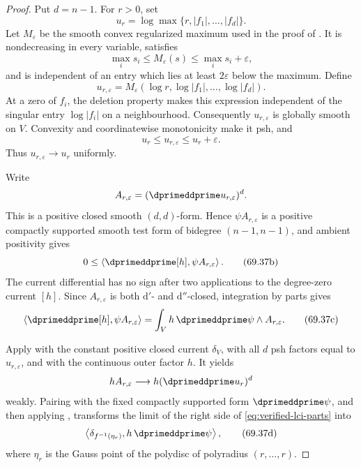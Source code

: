 \begin{proof}
Put \(d=n-1\).  For \(r>0\), set
\[
               u_r=\log\max\{r,|f_1|,\ldots,|f_d|\}.
\]
Let \(M_\varepsilon\) be the smooth convex regularized maximum used in the
proof of \cite[Proposition~16.9.1]{CLD25}.  It is nondecreasing in every
variable, satisfies
\[
 \max_i s_i\leq M_\varepsilon(s)
     \leq\max_i s_i+\varepsilon,
\]
and is independent of an entry which lies at least \(2\varepsilon\) below
the maximum.  Define
\[
 u_{r,\varepsilon}
 =M_\varepsilon(\log r,\log|f_1|,\ldots,\log|f_d|).
\]
At a zero of \(f_i\), the deletion property makes this expression
independent of the singular entry \(\log|f_i|\) on a neighbourhood.
Consequently \(u_{r,\varepsilon}\) is globally smooth on \(V\).  Convexity
and coordinatewise monotonicity make it psh, and
\[
 u_r\leq u_{r,\varepsilon}\leq u_r+\varepsilon.
\]
Thus \(u_{r,\varepsilon}\to u_r\) uniformly.

Write
\[
 A_{r,\varepsilon}
   =(\dprimeddprime u_{r,\varepsilon})^d.
\]
This is a positive closed smooth \((d,d)\)-form.  Hence
\(\psi A_{r,\varepsilon}\) is a positive compactly supported smooth test
form of bidegree \((n-1,n-1)\), and ambient positivity gives
\[
 0\leq
 \left\langle\dprimeddprime[h],
        \psi A_{r,\varepsilon}\right\rangle.
\tag{69.37b}\label{eq:verified-lci-ambient-positive}
\]
The current differential has no sign after two applications to the
degree-zero current \([h]\).  Since \(A_{r,\varepsilon}\) is both
\(\mathrm d'\)- and \(\mathrm d''\)-closed, integration by parts gives
\[
 \left\langle\dprimeddprime[h],
        \psi A_{r,\varepsilon}\right\rangle
 =\int_V h\,\dprimeddprime\psi\wedge A_{r,\varepsilon}.
\tag{69.37c}\label{eq:verified-lci-parts}
\]

Apply \cite[Proposition~8.7.2]{CLD25} with the constant positive closed
current \(\delta_V\), with all \(d\) psh factors equal to
\(u_{r,\varepsilon}\), and with the continuous outer factor \(h\).
It yields
\[
 hA_{r,\varepsilon}
       \longrightarrow h(\dprimeddprime u_r)^d
\]
weakly.  Pairing with the fixed compactly supported form
\(\dprimeddprime\psi\), and then applying
\cite[Corollary~18.6.2]{CLD25}, transforms the limit of the right side of
\eqref{eq:verified-lci-parts} into
\[
 \left\langle
       \delta_{f^{-1}(\eta_r)},h\,\dprimeddprime\psi
 \right\rangle,
\tag{69.37d}\label{eq:verified-lci-gauss-fibre}
\]
where \(\eta_r\) is the Gauss point of the polydisc of polyradius
\((r,\ldots,r)\).


\end{proof}
